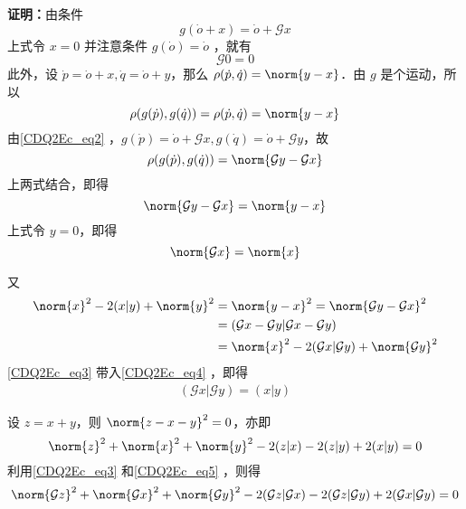 \textbf{证明：}由条件
\begin{equation}\label{CDQ2Ec_eq2}
g(\dot o+x)=\dot o+\mathcal G x
\end{equation}
上式令 $x=0$ 并注意条件 $g(\dot o)=\dot o$ ，就有
\begin{equation}
\mathcal G 0=0
\end{equation}
此外，设 $\dot p=\dot o+x,\dot q=\dot o+y$，那么 $\rho(\dot p,\dot q)=\norm{y-x}$．由 $g$ 是个运动，所以
\begin{equation}
\rho(g(\dot p),g(\dot q))=\rho(\dot p,\dot q)=\norm{y-x}
\end{equation}
由\autoref{CDQ2Ec_eq2} ，$g(\dot p)=\dot o+\mathcal G x, g(\dot q)=\dot o+\mathcal G y$，故
\begin{equation}
\rho(g(\dot p),g(\dot q))=\norm{\mathcal Gy-\mathcal Gx}
\end{equation}
上两式结合，即得
\begin{equation}
\norm{\mathcal Gy-\mathcal Gx}=\norm{y-x}
\end{equation}
上式令 $y=0$，即得
\begin{equation}\label{CDQ2Ec_eq3}
\norm{\mathcal G x}=\norm{x}
\end{equation}

又
\begin{equation}\label{CDQ2Ec_eq4}
\begin{aligned}
\norm{x}^2-2(x|y)+\norm{y}^2&=\norm{y-x}^2=\norm{\mathcal G y-\mathcal G x}^2\\
&=(\mathcal G x-\mathcal G y|\mathcal G x-\mathcal G y)\\
&=\norm{x}^2-2(\mathcal G x|\mathcal G y)+\norm{\mathcal G y}^2
\end{aligned}
\end{equation}
\autoref{CDQ2Ec_eq3} 带入\autoref{CDQ2Ec_eq4} ，即得
\begin{equation}\label{CDQ2Ec_eq5}
\begin{aligned}
(\mathcal G x|\mathcal G y)=(x|y)
\end{aligned}
\end{equation}

设 $z=x+y$，则 $\norm{z-x-y}^2=0$，亦即
\begin{equation}
\norm{z}^2+\norm{x}^2+\norm{y}^2-2(z|x)-2(z|y)+2(x|y)=0
\end{equation}
利用\autoref{CDQ2Ec_eq3} 和\autoref{CDQ2Ec_eq5} ，则得
\begin{equation}
\norm{\mathcal G z}^2+\norm{\mathcal G x}^2+\norm{\mathcal G y}^2-2(\mathcal G z|\mathcal G x)-2(\mathcal G z|\mathcal G y)+2(\mathcal G x|\mathcal G y)=0
\end{equation}



